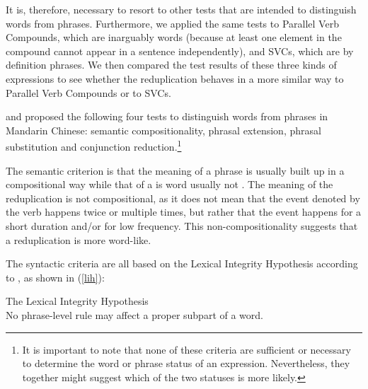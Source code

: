 It is, therefore, necessary to resort to other tests that are intended to distinguish words from phrases. 
Furthermore, we applied the same tests to Parallel Verb Compounds, which are inarguably words (because at least one element in the compound cannot appear in a sentence independently), 
and {SVC}s, which are by definition phrases. 
We then compared the test results of these three kinds of expressions to see whether the reduplication behaves in a more similar way to Parallel Verb Compounds or to {SVC}s.



\citet{Duanmu1998} and \citet{Schaefer2009} proposed the following four tests to
distinguish words from phrases in Mandarin Chinese: semantic compositionality, phrasal extension,
phrasal substitution and conjunction reduction.\footnote{It is important to note that none of these criteria are sufficient or necessary to determine the word or phrase status of an expression. Nevertheless, they together might suggest which of the two statuses is more likely.}

The semantic criterion is that the meaning of a phrase is usually built up in a compositional way while that of a is word usually not \citetext{\citealp[140]{Duanmu1998}; \citealp[275]{Schaefer2009}}. 
The meaning of the reduplication is not compositional, as it does not mean that the event denoted by the verb happens twice or multiple times, but rather that the event happens for a short duration and/or for low frequency.
This non-compositionality suggests that a reduplication is more word-like.


The syntactic criteria are all based on the Lexical Integrity Hypothesis according to \citet[60]{Huang1984}, as shown in (\ref{lih}):

\ea\label{lih}The Lexical Integrity Hypothesis\\
No phrase-level rule may affect a proper subpart of a word.
\z

